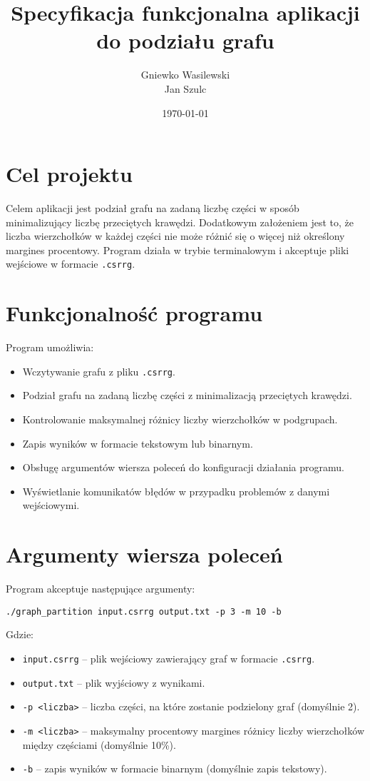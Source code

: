 \documentclass{article}
\title{Specyfikacja funkcjonalna aplikacji do podziału grafu}
\author{Gniewko Wasilewski\\Jan Szulc}
\date{\today}
\begin{document}
\maketitle

\section{Cel projektu}
Celem aplikacji jest podział grafu na zadaną liczbę części w sposób minimalizujący liczbę przeciętych krawędzi. Dodatkowym założeniem jest to, że liczba wierzchołków w każdej części nie może różnić się o więcej niż określony margines procentowy. Program działa w trybie terminalowym i akceptuje pliki wejściowe w formacie \texttt{.csrrg}.

\section{Funkcjonalność programu}
Program umożliwia:
\begin{itemize}
    \item Wczytywanie grafu z pliku \texttt{.csrrg}.
    \item Podział grafu na zadaną liczbę części z minimalizacją przeciętych krawędzi.
    \item Kontrolowanie maksymalnej różnicy liczby wierzchołków w podgrupach.
    \item Zapis wyników w formacie tekstowym lub binarnym.
    \item Obsługę argumentów wiersza poleceń do konfiguracji działania programu.
    \item Wyświetlanie komunikatów błędów w przypadku problemów z danymi wejściowymi.
\end{itemize}
\newpage
\section{Argumenty wiersza poleceń}
Program akceptuje następujące argumenty:

\begin{verbatim}
./graph_partition input.csrrg output.txt -p 3 -m 10 -b
\end{verbatim}

Gdzie:
\begin{itemize}
    \item \texttt{input.csrrg} – plik wejściowy zawierający graf w formacie \texttt{.csrrg}.
    \item \texttt{output.txt} – plik wyjściowy z wynikami.
    \item \texttt{-p <liczba>} – liczba części, na które zostanie podzielony graf (domyślnie 2).
    \item \texttt{-m <liczba>} – maksymalny procentowy margines różnicy liczby wierzchołków między częściami (domyślnie 10\%).
    \item \texttt{-b} – zapis wyników w formacie binarnym (domyślnie zapis tekstowy).
\end{itemize}
\end{document}
